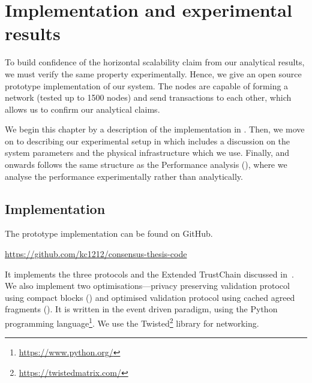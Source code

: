 \chapter{Implementation and experimental results}
\label{ch:implementation}

To build confidence of the horizontal scalability claim from our analytical results,
we must verify the same property experimentally.
Hence, we give an open source prototype implementation of our system.
The nodes are capable of forming a network (tested up to 1500 nodes) and send transactions to each other,
which allows us to confirm our analytical claims.

We begin this chapter by a description of the implementation in .
Then, we move on to describing our experimental setup in  which includes a discussion on the system parameters and the physical infrastructure which we use.
Finally,  and onwards follows the same structure as the Performance analysis (),
where we analyse the performance experimentally rather than analytically.


\section{Implementation}
\label{sec:implementation}

The prototype implementation can be found on GitHub.
\begin{displayquote}
\url{https://github.com/kc1212/consensus-thesis-code}
\end{displayquote}
It implements the three protocols and the Extended TrustChain discussed in~.
We also implement two optimisations---privacy preserving validation protocol using compact blocks ()
and optimised validation protocol using cached agreed fragments ().
It is written in the event driven paradigm, using the Python programming language\footnote{\url{https://www.python.org/}}.
We use the Twisted\footnote{\url{https://twistedmatrix.com/}} library for networking.

